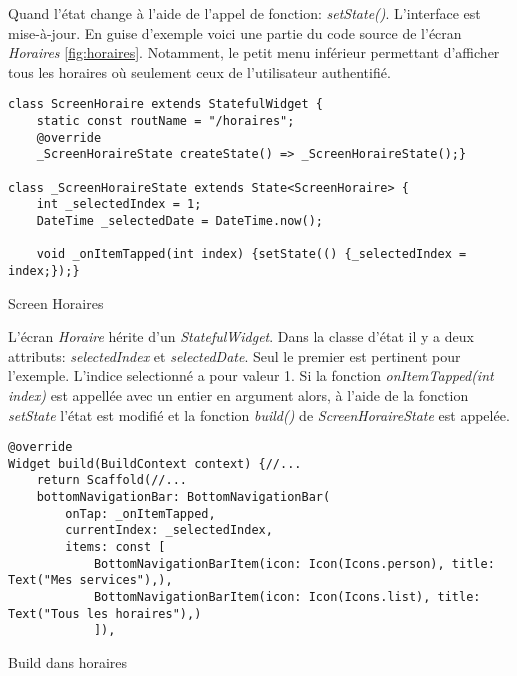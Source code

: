     Quand l'état change à l'aide de l'appel de fonction: \textit{setState()}. L'interface est mise-à-jour. En guise d'exemple voici une partie du code source
    de l'écran \textit{Horaires} \ref{fig:horaires}. Notamment, le petit menu inférieur permettant d'afficher tous les horaires où seulement ceux de l'utilisateur
    authentifié.
    \begin{listing}[h]
        \begin{verbatim}
class ScreenHoraire extends StatefulWidget {
    static const routName = "/horaires";
    @override
    _ScreenHoraireState createState() => _ScreenHoraireState();}

class _ScreenHoraireState extends State<ScreenHoraire> {
    int _selectedIndex = 1;
    DateTime _selectedDate = DateTime.now();

    void _onItemTapped(int index) {setState(() {_selectedIndex = index;});}
        \end{verbatim}
    \caption{Screen Horaires}
    \label{code:screenHoraires}
    \end{listing}
    
    L'écran \textit{Horaire} hérite d'un \textit{StatefulWidget}. Dans la classe d'état il y a deux attributs: \textit{selectedIndex} et \textit{selectedDate}.
    Seul le premier est pertinent pour l'exemple. L'indice selectionné a pour valeur 1. 
    Si la fonction \textit{onItemTapped(int index)} est appellée avec un entier en argument alors, à l'aide de la fonction \textit{setState} l'état est modifié
    et la fonction \textit{build()} de \textit{ScreenHoraireState} est appelée.

    \begin{listing}[h]
        \begin{verbatim}
@override
Widget build(BuildContext context) {//...
    return Scaffold(//...
    bottomNavigationBar: BottomNavigationBar(
        onTap: _onItemTapped,
        currentIndex: _selectedIndex,
        items: const [
            BottomNavigationBarItem(icon: Icon(Icons.person), title: Text("Mes services"),),
            BottomNavigationBarItem(icon: Icon(Icons.list), title: Text("Tous les horaires"),)
            ]),
        \end{verbatim}
    \caption{Build dans horaires}
    \label{code:buildHoraire}
    \end{listing}

